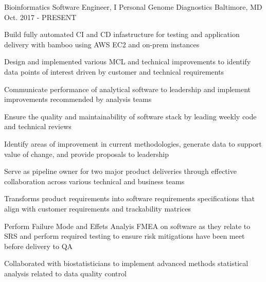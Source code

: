 

\begin{cventries}

  \cventry
    {Bioinformatics Software Engineer, I} %
    {Personal Genome Diagnostics} %
    {Baltimore, MD} %
    {Oct. 2017 - PRESENT} %
    {
      \begin{cvitems} %
        \item{Build fully automated CI and CD infastructure for testing and application delivery with bamboo using AWS EC2 and on-prem instances}
        \item{Design and implemented various MCL and technical improvements to identify data points of interest driven by customer and technical requirements}
        \item{Communicate performance of analytical software to leadership and implement improvements recommended by analysis teams}
        \item{Ensure the quality and maintainability of software stack by leading weekly code and technical reviews}
        \item{Identify areas of improvement in current methodologies, generate data to support value of change, and provide proposals to leadership}
        \item{Serve as pipeline owner for two major product deliveries through effective collaboration across various technical and business teams}
        \item{Transforms product requirements into software requirements specifications that align with customer requirements and trackability matrices}
        \item{Perform Failure Mode and Effets Analyis FMEA on software as they relate to SRS and perform required testing to ensure risk mitigations have been meet before delivery to QA}
        \item{Collaborated with biostatisticians to implement advanced methods statistical analysis related to data quality control}

\end{cvitems}}
\end{cventries}
